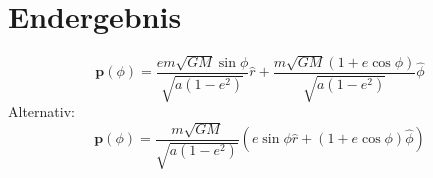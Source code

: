 \section{Endergebnis}
\[
\boxed{ \mathbf{p}(\phi) = \frac{e m \sqrt{GM} \sin \phi}{\sqrt{a (1 - e^2)}} \hat{r} + \frac{m \sqrt{GM} (1 + e \cos \phi)}{\sqrt{a (1 - e^2)}} \hat{\phi} }
\]
Alternativ:
\[
\mathbf{p}(\phi) = \frac{m \sqrt{GM}}{\sqrt{a (1 - e^2)}} \left( e \sin \phi \hat{r} + (1 + e \cos \phi) \hat{\phi} \right)
\]